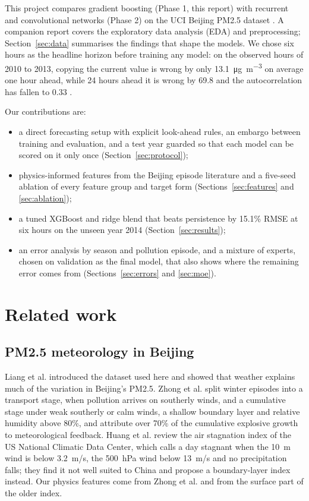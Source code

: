\documentclass[conference]{IEEEtran}
\newcommand{\ugm}{\si{\micro\gram\per\cubic\metre}}
\begin{document}
This project compares gradient boosting (Phase 1, this report) with recurrent and convolutional networks (Phase 2) on the UCI Beijing PM2.5 dataset \cite{uci}. A companion report \cite{datareport} covers the exploratory data analysis (EDA) and preprocessing; Section~\ref{sec:data} summarises the findings that shape the models. We chose six hours as the headline horizon before training any model: on the observed hours of 2010 to 2013, copying the current value is wrong by only 13.1~\ugm{} on average one hour ahead, while 24 hours ahead it is wrong by 69.8 and the autocorrelation has fallen to 0.33 \cite{datareport}.

Our contributions are:
\begin{itemize}
\item a direct forecasting setup with explicit look-ahead rules, an embargo between training and evaluation, and a test year guarded so that each model can be scored on it only once (Section~\ref{sec:protocol});
\item physics-informed features from the Beijing episode literature and a five-seed ablation of every feature group and target form (Sections~\ref{sec:features} and \ref{sec:ablation});
\item a tuned XGBoost and ridge blend that beats persistence by 15.1\% RMSE at six hours on the unseen year 2014 (Section~\ref{sec:results});
\item an error analysis by season and pollution episode, and a mixture of experts, chosen on validation as the final model, that also shows where the remaining error comes from (Sections~\ref{sec:errors} and \ref{sec:moe}).
\end{itemize}

\section{Related work}
\label{sec:related}

\subsection{PM2.5 meteorology in Beijing}
Liang et al. \cite{liang2015} introduced the dataset used here and showed that weather explains much of the variation in Beijing's PM2.5. Zhong et al. \cite{zhong2018} split winter episodes into a transport stage, when pollution arrives on southerly winds, and a cumulative stage under weak southerly or calm winds, a shallow boundary layer and relative humidity above 80\%, and attribute over 70\% of the cumulative explosive growth to meteorological feedback. Huang et al. \cite{huang2018} review the air stagnation index of the US National Climatic Data Center, which calls a day stagnant when the 10~m wind is below 3.2~m/s, the 500~hPa wind below 13~m/s and no precipitation falls; they find it not well suited to China and propose a boundary-layer index instead. Our physics features come from Zhong et al. and from the surface part of the older index.
\end{document}

